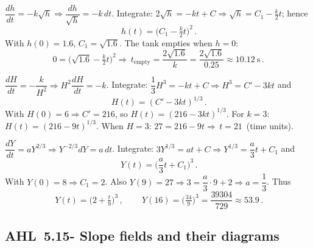 \documentclass[11pt]{article}
\newcommand{\tocsubsection}[1]{\subsection{#1}}
\begin{document}
\begin{solution}
$\dfrac{dh}{dt}=-k\sqrt{h}\Rightarrow \dfrac{dh}{\sqrt{h}}=-k\,dt$.
Integrate: $2\sqrt{h}=-kt+C\Rightarrow \sqrt{h}=C_1-\frac{k}{2}t$; hence
\[
\boxed{\,h(t)=\Big(C_1-\tfrac{k}{2}t\Big)^{2}\,}.
\]
With $h(0)=1.6$, $C_1=\sqrt{1.6}$. The tank empties when $h=0$:
\[
0=\Big(\sqrt{1.6}-\tfrac{k}{2}t\Big)^2\Rightarrow 
\boxed{\,t_{\text{empty}}=\frac{2\sqrt{1.6}}{k}
=\frac{2\sqrt{1.6}}{0.25}\approx 10.12\ \text{s}\,}.
\]
\end{solution}

\begin{solution}
$\dfrac{dH}{dt}=-\dfrac{k}{H^{2}}\Rightarrow H^{2}\dfrac{dH}{dt}=-k$.
Integrate: $\dfrac{1}{3}H^{3}=-kt+C\Rightarrow H^{3}=C'-3kt$ and
\[
\boxed{\,H(t)=(C'-3kt)^{1/3}\,}.
\]
With $H(0)=6\Rightarrow C'=216$, so $H(t)=(216-3kt)^{1/3}$.
For $k=3$: $H(t)=(216-9t)^{1/3}$.  When $H=3$:
$27=216-9t\Rightarrow \boxed{\,t=21\,}$ (time units).
\end{solution}

\begin{solution}
$\dfrac{dY}{dt}=aY^{2/3}\Rightarrow Y^{-2/3}dY=a\,dt$.
Integrate: $3Y^{1/3}=at+C\Rightarrow Y^{1/3}=\dfrac{a}{3}t+C_1$ and
\[
\boxed{\,Y(t)=\Big(\dfrac{a}{3}t+C_1\Big)^{3}\,}.
\]
With $Y(0)=8\Rightarrow C_1=2$.  Also $Y(9)=27\Rightarrow
3=\dfrac{a}{3}\cdot 9+2\Rightarrow a=\dfrac{1}{3}$.
Thus
\[
\boxed{\,Y(t)=\Big(2+\tfrac{t}{9}\Big)^{3}\,},\qquad
\boxed{\,Y(16)=\Big(\tfrac{34}{9}\Big)^{3}=\frac{39304}{729}\approx 53.9\,}.
\]
\end{solution}





\tocsubsection{AHL 5.15- Slope fields and their diagrams}

\end{document}
